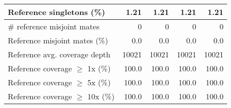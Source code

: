 \documentclass[12pt,a4paper]{article}
\begin{document}
\begin{table}[ht]
\begin{center}
\begin{tabular}{|l*{4}{|r}|}
Reference singletons (\%) & 1.21 & 1.21 & 1.21 & 1.21 \\ \hline
\# reference misjoint mates & 0 & 0 & 0 & 0 \\ \hline
Reference misjoint mates (\%) & 0.0 & 0.0 & 0.0 & 0.0 \\ \hline
Reference avg. coverage depth & 10021 & 10021 & 10021 & 10021 \\ \hline
Reference coverage $\geq$ 1x (\%) & 100.0 & 100.0 & 100.0 & 100.0 \\ \hline
Reference coverage $\geq$ 5x (\%) & 100.0 & 100.0 & 100.0 & 100.0 \\ \hline
Reference coverage $\geq$ 10x (\%) & 100.0 & 100.0 & 100.0 & 100.0 \\ \hline
\end{tabular}
\end{center}
\end{table}
\end{document}
